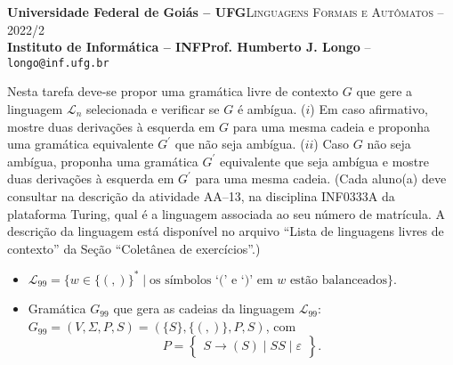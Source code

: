 \documentclass[12pt]{article}
\def\discente{Fulana(o) de tal}
\def\matricula{20010101}
\def\ua{13}
\def\myling{{99}} %
\newcommand{\ve}{\ensuremath{\varepsilon}}
\begin{document}
 \begin{tcolorbox}[rounded corners, colback=blue!3, colframe=blue!40!black]
  \footnotesize\textbf{Universidade Federal de Goiás -- UFG}\hfill \textsc{Linguagens Formais e Autômatos -- 2022/2}\\
  \footnotesize\textbf{Instituto de Informática -- INF\hfill Prof. Humberto J. Longo} -- \scriptsize\texttt{longo@inf.ufg.br}
 \end{tcolorbox}\bigskip
%
\begin{tcolorbox}[rounded corners, colback=blue!2, colframe=blue!40!black, title=\textbf{Atividade AA-\ua}]
  Nesta tarefa deve-se propor uma gramática livre de contexto $G$ que gere a linguagem $\mathcal{L}_n$ selecionada e verificar se $G$ é ambígua. ($i$) Em caso afirmativo, mostre duas derivações à esquerda em $G$ para uma mesma cadeia e proponha uma gramática equivalente $G^\prime$ que não seja ambígua. ($ii$) Caso $G$ não seja ambígua, proponha uma gramática $G^\prime$ equivalente que seja ambígua e mostre duas derivações à esquerda em $G^\prime$ para uma mesma cadeia. (Cada aluno(a) deve consultar na descrição da atividade AA--\ua, na disciplina INF0333A da plataforma Turing, qual é a linguagem associada ao seu número de matrícula. A descrição da linguagem está disponível no arquivo ``Lista de linguagens livres de contexto'' da Seção ``Coletânea de exercícios''.)
\end{tcolorbox}\bigskip

%
\begin{tcolorbox}[rounded corners, colback=yellow!5, colframe=red!40!black, title={\discente\ (\matricula)}]
\begin{itemize}
  \item $\mathcal{L}_{\myling} = \{w\in\{(,)\}^*\mid\text{os símbolos `(' e `)' em $w$ estão balanceados} \}$.
  \item Gramática $G_{\myling}$ que gera as cadeias da linguagem $\mathcal{L}_{\myling}$:\\   $G_{\myling}=(V,\Sigma,P,S)=(\{S\},\{(,)\},P,S)$, com
  $$
   P =
   \left\{\begin{array}{l}
    S \to (S) \mid SS \mid \ve
   \end{array}\right\}.
  $$
 \end{itemize}
\end{tcolorbox}\bigskip
\end{document}
